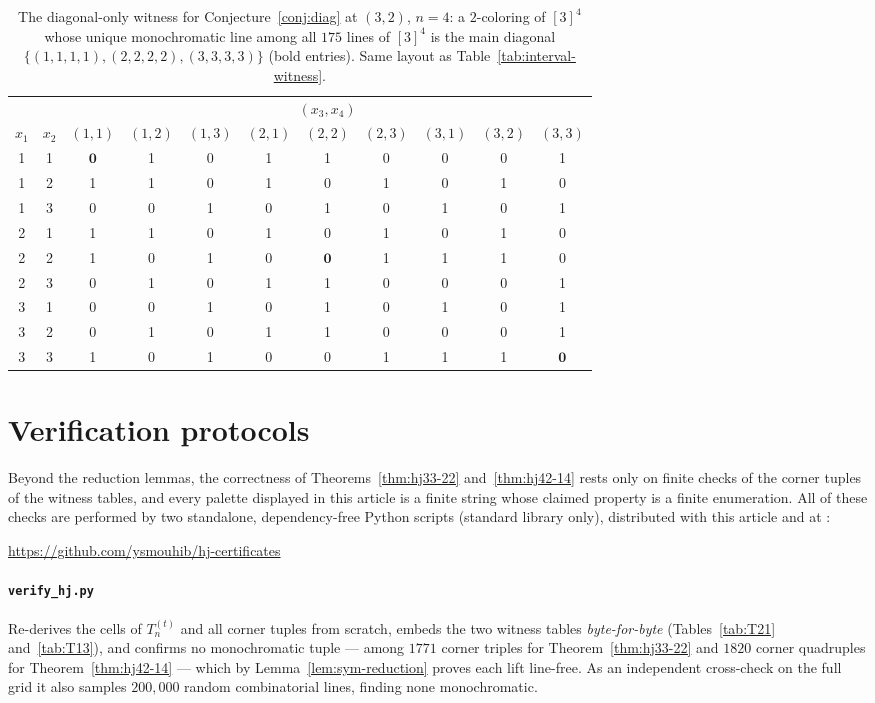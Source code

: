 \documentclass[12pt]{article}
\begin{document}
\begin{table}[ht]
\centering
\caption{The diagonal-only witness for Conjecture~\ref{conj:diag} at
$(3,2)$, $n=4$: a $2$-coloring of $[3]^{4}$ whose unique monochromatic
line among all $175$ lines of $[3]^{4}$ is the main diagonal
$\{(1,1,1,1),(2,2,2,2),(3,3,3,3)\}$ (bold entries). Same layout as
Table~\ref{tab:interval-witness}.}
\label{tab:diag-witness}
\begin{tabular}{@{}ccccccccccc@{}}
\toprule
& & \multicolumn{9}{c}{$(x_{3},x_{4})$}\\
\cmidrule(l){3-11}
$x_{1}$ & $x_{2}$ & $(1,1)$ & $(1,2)$ & $(1,3)$ & $(2,1)$ & $(2,2)$ & $(2,3)$ & $(3,1)$ & $(3,2)$ & $(3,3)$\\
\midrule
1 & 1 & $\mathbf{0}$ & 1 & 0 & 1 & 1 & 0 & 0 & 0 & 1\\
1 & 2 & 1 & 1 & 0 & 1 & 0 & 1 & 0 & 1 & 0\\
1 & 3 & 0 & 0 & 1 & 0 & 1 & 0 & 1 & 0 & 1\\
2 & 1 & 1 & 1 & 0 & 1 & 0 & 1 & 0 & 1 & 0\\
2 & 2 & 1 & 0 & 1 & 0 & $\mathbf{0}$ & 1 & 1 & 1 & 0\\
2 & 3 & 0 & 1 & 0 & 1 & 1 & 0 & 0 & 0 & 1\\
3 & 1 & 0 & 0 & 1 & 0 & 1 & 0 & 1 & 0 & 1\\
3 & 2 & 0 & 1 & 0 & 1 & 1 & 0 & 0 & 0 & 1\\
3 & 3 & 1 & 0 & 1 & 0 & 0 & 1 & 1 & 1 & $\mathbf{0}$\\
\bottomrule
\end{tabular}
\end{table}

\section{Verification protocols}\label{app:verifier}

Beyond the reduction lemmas, the correctness of
Theorems~\ref{thm:hj33-22} and~\ref{thm:hj42-14} rests only on finite
checks of the corner tuples of the witness tables, and every palette
displayed in this article is a finite string whose claimed property is
a finite enumeration. All of these checks are performed by two
standalone, dependency-free Python scripts (standard library only),
distributed with this article and at \cite{hjcerts}:
\begin{center}
\url{https://github.com/ysmouhib/hj-certificates}
\end{center}

\paragraph{\texttt{verify\_hj.py}}
Re-derives the cells of $T_{n}^{(t)}$ and all corner tuples from
scratch, embeds the two witness tables \emph{byte-for-byte}
(Tables~\ref{tab:T21} and~\ref{tab:T13}), and confirms no monochromatic
tuple --- among $1771$ corner triples for Theorem~\ref{thm:hj33-22} and
$1820$ corner quadruples for Theorem~\ref{thm:hj42-14} --- which by
Lemma~\ref{lem:sym-reduction} proves each lift line-free. As an
independent cross-check on the full grid it also samples $200{,}000$
random combinatorial lines, finding none monochromatic.
\end{document}
